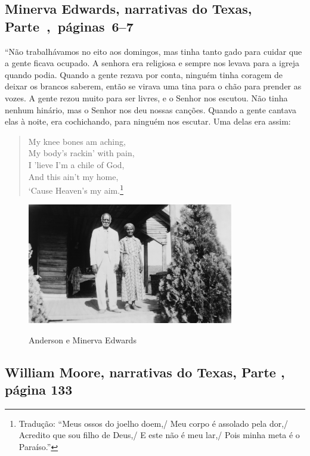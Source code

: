 \subsection{Minerva Edwards, narrativas do Texas, Parte~,~páginas~6--7} \label{ref82}

``Não trabalhávamos no eito aos domingos, mas tinha tanto gado para
cuidar que a gente ficava ocupado. A senhora era religiosa e sempre nos
levava para a igreja quando podia. Quando a gente rezava por conta,
ninguém tinha coragem de deixar os brancos saberem, então se virava uma
tina para o chão para prender as vozes. A gente rezou muito para ser
livres, e o Senhor nos escutou. Não tinha nenhum hinário, mas o Senhor
nos deu nossas canções. Quando a gente cantava elas à noite, era
cochichando, para ninguém nos escutar. Uma delas era assim:

\begin{verse}
My knee bones am aching,\\
My body's rackin' with pain,\\
I 'lieve I'm a chile of God,\\
And this ain't my home,\\
`Cause Heaven's my aim.\footnote{Tradução: ``Meus ossos do joelho doem,/ Meu corpo é assolado pela dor,/ Acredito que sou filho de Deus,/ E este não é meu lar,/ Pois minha meta é o Paraíso.''}
\end{verse}

\begin{figure}[!ht]
\centering
 \includegraphics[width=90mm]{./imgs/anderson_minervaedwards_recorte.jpg} \label{img16}
\caption{Anderson e Minerva Edwards}
\end{figure}

\subsection{William Moore, narrativas do Texas, Parte , página 133}
\label{ref197}

